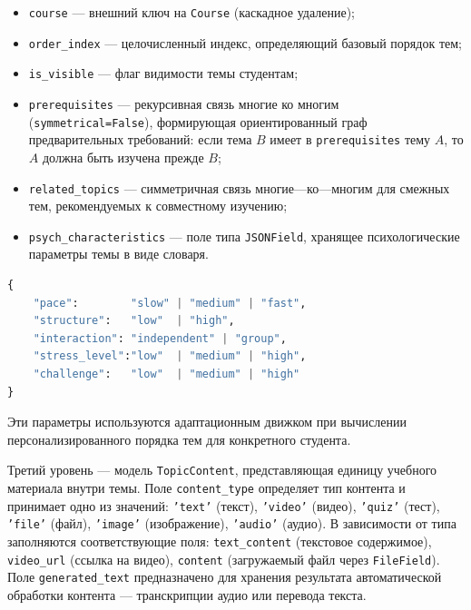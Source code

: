 \begin{itemize}
    \item \texttt{course} --- внешний ключ на \texttt{Course} 
          (каскадное удаление);
    \item \texttt{order\_index} --- целочисленный индекс, определяющий 
          базовый порядок тем;
    \item \texttt{is\_visible} --- флаг видимости темы студентам;
    \item \texttt{prerequisites} --- рекурсивная связь многие ко многим\\ 
          (\texttt{symmetrical=False}), формирующая ориентированный граф 
          предварительных требований: если тема $B$ имеет в 
          \texttt{prerequisites} тему $A$, то $A$ должна быть изучена 
          прежде $B$;
    \item \texttt{related\_topics} --- симметричная связь многие---ко---многим 
          для смежных тем, рекомендуемых к совместному изучению;
    \item \texttt{psych\_characteristics} --- поле типа \texttt{JSONField}, 
          хранящее психологические параметры темы в виде словаря.
\end{itemize}

\begin{lstlisting}[language=Python, caption={Структура поля psych\_characteristics}, basicstyle=\small\ttfamily]
{
    "pace":        "slow" | "medium" | "fast",
    "structure":   "low"  | "high",
    "interaction": "independent" | "group",
    "stress_level":"low"  | "medium" | "high",
    "challenge":   "low"  | "medium" | "high"
}
\end{lstlisting}

Эти параметры используются адаптационным движком при вычислении 
персонализированного порядка тем для конкретного студента.

Третий уровень --- модель \texttt{TopicContent}, представляющая единицу 
учебного материала внутри темы. Поле \texttt{content\_type} определяет 
тип контента и принимает одно из значений: \texttt{'text'} (текст), 
\texttt{'video'} (видео), \texttt{'quiz'} (тест), \texttt{'file'} 
(файл), \texttt{'image'} (изображение), \texttt{'audio'} (аудио). 
В зависимости от типа заполняются соответствующие поля: 
\texttt{text\_content} (текстовое содержимое), \texttt{video\_url} 
(ссылка на видео), \texttt{content} (загружаемый файл через 
\texttt{FileField}). Поле \texttt{generated\_text} предназначено для 
хранения результата автоматической обработки контента --- транскрипции 
аудио или перевода текста.

